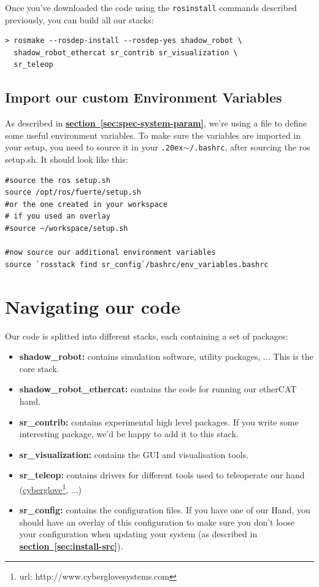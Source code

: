 \documentclass[12pt]{article}
\newcommand{\linuxtilde}{\raise.20ex\hbox{$\scriptstyle\mathtt{\sim}$}}
\newcommand{\link}[1]{\hyperref[sec:#1]{\textbf{section~\ref*{sec:#1}}}}
\newcommand{\betterhref}[2]{\href{#1}{#2}\footnote{url: #1}}
\begin{document}
\par Once you've downloaded the code using the \texttt{rosinstall} commands described previously, you can build all our stacks:
  \begin{lstlisting}[escapeinside='']
> rosmake --rosdep-install --rosdep-yes shadow_robot \
  shadow_robot_ethercat sr_contrib sr_visualization \
  sr_teleop
  \end{lstlisting}

\subsection{Import our custom Environment Variables}
\label{sec:import-vars}
\par As described in \link{spec-system-param}, we're using a file to define some useful environment variables. To make sure the variables are imported in your setup, you need to source it in your \texttt{\linuxtilde/.bashrc}, after sourcing the ros setup.sh. It should look like this:
  \begin{lstlisting}[title={\textbf{\linuxtilde/.bashrc}}, upquote=true]
#source the ros setup.sh
source /opt/ros/fuerte/setup.sh
#or the one created in your workspace
# if you used an overlay
#source ~/workspace/setup.sh

#now source our additional environment variables
source `rosstack find sr_config`/bashrc/env_variables.bashrc
  \end{lstlisting}

\newpage

\section{Navigating our code}
\label{sec:navigate}

\par Our code is splitted into different stacks, each containing a set of packages:
\begin{itemize}
\item \textbf{shadow\_robot:} contains simulation software, utility packages, ... This is the core stack.
\item \textbf{shadow\_robot\_ethercat:} contains the code for running our etherCAT hand.
\item \textbf{sr\_contrib:} contains experimental high level packages. If you write some interesting package, we'd be happy to add it to this stack.
\item \textbf{sr\_visualization:} contains the GUI and visualisation tools.
\item \textbf{sr\_teleop:} contains drivers for different tools used to teleoperate our hand (\betterhref{http://www.cyberglovesystems.com}{cyberglove}, ...)
\item \textbf{sr\_config:} contains the configuration files. If you have one of our Hand, you should have an overlay of this configuration to make sure you don't loose your configuration when updating your system (as described in \link{install-src}).
\end{itemize}
\end{document}
